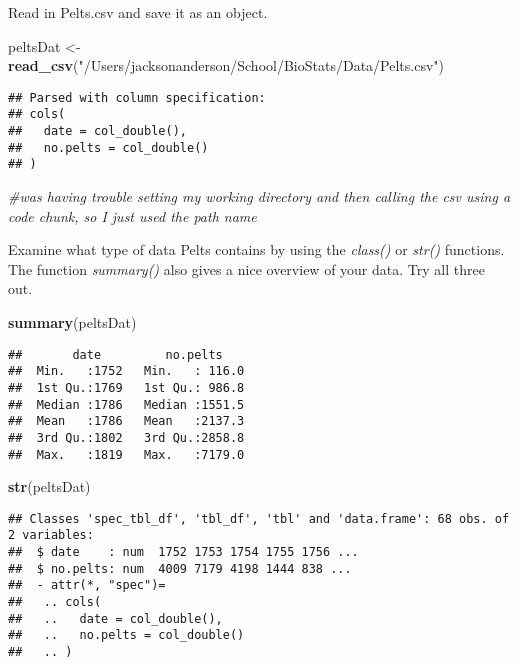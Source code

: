 \documentclass[]{article}
\newenvironment{Shaded}{\begin{snugshade}}{\end{snugshade}}
\newcommand{\CommentTok}[1]{\textcolor[rgb]{0.56,0.35,0.01}{\textit{#1}}}
\newcommand{\KeywordTok}[1]{\textcolor[rgb]{0.13,0.29,0.53}{\textbf{#1}}}
\newcommand{\NormalTok}[1]{#1}
\newcommand{\StringTok}[1]{\textcolor[rgb]{0.31,0.60,0.02}{#1}}
\begin{document}
Read in Pelts.csv and save it as an object.

\begin{Shaded}
\begin{Highlighting}[]
\NormalTok{peltsDat <-}\StringTok{ }\KeywordTok{read_csv}\NormalTok{(}\StringTok{"/Users/jacksonanderson/School/BioStats/Data/Pelts.csv"}\NormalTok{)}
\end{Highlighting}
\end{Shaded}

\begin{verbatim}
## Parsed with column specification:
## cols(
##   date = col_double(),
##   no.pelts = col_double()
## )
\end{verbatim}

\begin{Shaded}
\begin{Highlighting}[]
\CommentTok{#was having trouble setting my working directory and then calling the csv using a code chunk, so I just used the path name}
\end{Highlighting}
\end{Shaded}

Examine what type of data Pelts contains by using the \emph{class()} or
\emph{str()} functions. The function \emph{summary()} also gives a nice
overview of your data. Try all three out.

\begin{Shaded}
\begin{Highlighting}[]
\KeywordTok{summary}\NormalTok{(peltsDat)}
\end{Highlighting}
\end{Shaded}

\begin{verbatim}
##       date         no.pelts     
##  Min.   :1752   Min.   : 116.0  
##  1st Qu.:1769   1st Qu.: 986.8  
##  Median :1786   Median :1551.5  
##  Mean   :1786   Mean   :2137.3  
##  3rd Qu.:1802   3rd Qu.:2858.8  
##  Max.   :1819   Max.   :7179.0
\end{verbatim}

\begin{Shaded}
\begin{Highlighting}[]
\KeywordTok{str}\NormalTok{(peltsDat)}
\end{Highlighting}
\end{Shaded}

\begin{verbatim}
## Classes 'spec_tbl_df', 'tbl_df', 'tbl' and 'data.frame': 68 obs. of  2 variables:
##  $ date    : num  1752 1753 1754 1755 1756 ...
##  $ no.pelts: num  4009 7179 4198 1444 838 ...
##  - attr(*, "spec")=
##   .. cols(
##   ..   date = col_double(),
##   ..   no.pelts = col_double()
##   .. )
\end{verbatim}
\end{document}
